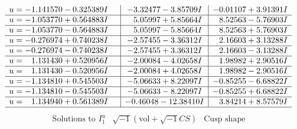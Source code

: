 \documentclass[1p]{elsarticle_modified}
\theoremstyle{definition}
\newcommand{\I}{\sqrt{-1}}
\begin{document}
$$\begin{array}{c|c|c}
\begin{aligned}
u &= -1.141570 - 0.325389 I\end{aligned}
 & -3.32477 - 3.85709 I & -0.01107 + 3.91391 I \\ \hline\begin{aligned}
u &= -1.053770 + 0.564883 I\end{aligned}
 & \phantom{-}5.05997 + 5.85664 I & \phantom{-}8.52563 - 5.76903 I \\ \hline\begin{aligned}
u &= -1.053770 - 0.564883 I\end{aligned}
 & \phantom{-}5.05997 - 5.85664 I & \phantom{-}8.52563 + 5.76903 I \\ \hline\begin{aligned}
u &= -0.276974 + 0.740238 I\end{aligned}
 & -2.57455 - 3.36312 I & \phantom{-}2.16603 + 3.13288 I \\ \hline\begin{aligned}
u &= -0.276974 - 0.740238 I\end{aligned}
 & -2.57455 + 3.36312 I & \phantom{-}2.16603 - 3.13288 I \\ \hline\begin{aligned}
u &= \phantom{-}1.131430 + 0.520956 I\end{aligned}
 & -2.00084 - 4.02658 I & \phantom{-}1.98982 + 2.90516 I \\ \hline\begin{aligned}
u &= \phantom{-}1.131430 - 0.520956 I\end{aligned}
 & -2.00084 + 4.02658 I & \phantom{-}1.98982 - 2.90516 I \\ \hline\begin{aligned}
u &= -1.134810 + 0.545503 I\end{aligned}
 & -5.06633 + 8.22097 I & -0.85255 - 6.68822 I \\ \hline\begin{aligned}
u &= -1.134810 - 0.545503 I\end{aligned}
 & -5.06633 - 8.22097 I & -0.85255 + 6.68822 I \\ \hline\begin{aligned}
u &= \phantom{-}1.134940 + 0.561389 I\end{aligned}
 & -0.46048 - 12.38410 I & \phantom{-}3.84214 + 8.57579 I\\
 \hline 
 \end{array}$$\newpage$$\begin{array}{c|c|c}  
\text{Solutions to }I^u_{1}& \I (\text{vol} + \sqrt{-1}CS) & \text{Cusp shape}\\

\end{array}$$
\end{document}

